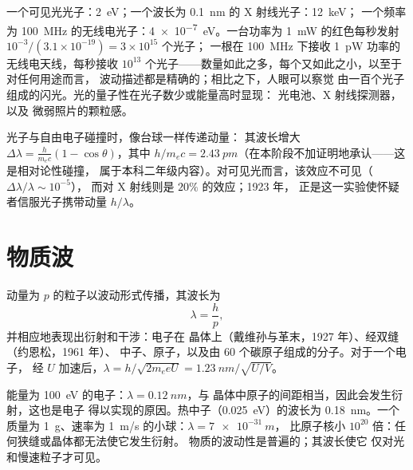 \begin{example}[数量级]\label{ex:b1:quantum-introduction:orders}
一个可见光光子：\qty{2}{eV}；一个波长为 \qty{0.1}{nm} 的 X 射线光子：\qty{12}{keV}；
一个频率为 \qty{100}{MHz} 的无线电光子：\qty{4e-7}{eV}。一台功率为 \qty{1}{mW} 的红色每秒发射 $10^{-3}/(3.1 \times 10^{-19}) = 3 \times 10^{15}$ 个光子；
一根在 \qty{100}{MHz} 下接收 \qty{1}{pW} 功率的无线电天线，每秒接收 $10^{13}$
个光子——数量如此之多，每个又如此之小，以至于对任何用途而言，
波动描述都是精确的；相比之下，人眼可以察觉
由一百个光子组成的闪光。光的量子性在光子数少或能量高时显现：
光电池、X 射线探测器，以及
微弱照片的颗粒感。
%
\end{example}

\begin{remark}[康普顿散射]\label{rem:b1:quantum-introduction:compton}
光子与自由电子碰撞时，像台球一样传递动量：
其波长增大 $\Delta\lambda = \frac{h}{m_ec}(1 -
\cos\theta)$，其中 $h/m_ec = \qty{2.43}{pm}$（在本阶段不加证明地承认——这是相对论性碰撞，
属于本科二年级内容）。对可见光而言，该效应不可见（$\Delta\lambda/\lambda \sim 10^{-5}$），
而对 X 射线则是 $20\%$ 的效应；1923 年，
正是这一实验使怀疑者信服光子携带动量 $h/\lambda$。
\end{remark}

\section{物质波}

\begin{theorem}[德布罗意]\label{thm:b1:quantum-introduction:debroglie}
动量为 $p$ 的粒子以波动形式传播，其波长为
\[
\lambda = \frac{h}{p} ,
\]
并相应地表现出衍射和干涉：电子在
晶体上（戴维孙与革末，1927 年）、经双缝（约恩松，1961 年）、
中子、原子，以及由 60 个碳原子组成的分子。对于一个电子，
经 $U$ 加速后，$\lambda = h/\sqrt{2m_eeU} = \qty{1.23}{nm}/\sqrt{U/\unit{V}}$。
\end{theorem}
\admitted

\begin{example}[为何从未观察到它]\label{ex:b1:quantum-introduction:wavelengths}
能量为 \qty{100}{eV} 的电子：$\lambda = \qty{0.12}{nm}$，与
晶体中原子的间距相当，因此会发生衍射，这也是电子
得以实现的原因。热中子（\qty{0.025}{eV}）的波长为 \qty{0.18}{nm}。一个
质量为 \qty{1}{g}、速率为 \qty{1}{m/s} 的小球：$\lambda = \qty{7e-31}{m}$，
比原子核小 $10^{20}$ 倍：任何狭缝或晶体都无法使它发生衍射。
物质的波动性是普遍的；其波长使它
仅对光和慢速粒子才可见。
\end{example}

